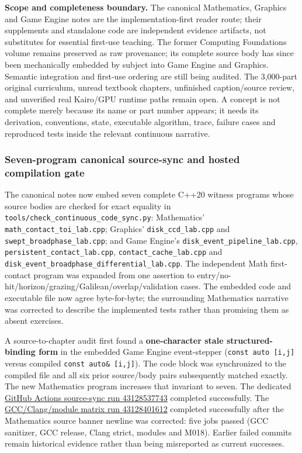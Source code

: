 \textbf{Scope and completeness boundary.} The canonical Mathematics, Graphics and Game Engine notes are the implementation-first reader route; their supplements and standalone code are independent evidence artifacts, not substitutes for essential first-use teaching. The former Computing Foundations volume remains preserved as raw provenance; its complete source body has since been mechanically embedded by subject into Game Engine and Graphics. Semantic integration and first-use ordering are still being audited. The 3,000-part original curriculum, unread textbook chapters, unfinished caption/source review, and unverified real Kairo/GPU runtime paths remain open. A concept is not complete merely because its name or part number appears; it needs its derivation, conventions, state, executable algorithm, trace, failure cases and reproduced tests inside the relevant continuous narrative.

\subsubsection{Seven-program canonical source-sync and hosted compilation gate}\label{appendix-3b67654799a2-seven-program-canonical-source-sync-and-hosted-compilation-gate}

The canonical notes now embed seven complete C++20 witness programs whose source bodies are checked for exact equality in \texttt{tools/check\_continuous\_code\_sync.py}: Mathematics' \texttt{math\_contact\_toi\_lab.cpp}; Graphics' \texttt{disk\_ccd\_lab.cpp} and \texttt{swept\_broadphase\_lab.cpp}; and Game Engine's \texttt{disk\_event\_pipeline\_lab.cpp}, \texttt{persistent\_contact\_lab.cpp}, \texttt{contact\_cache\_lab.cpp} and \texttt{disk\_event\_broadphase\_differential\_lab.cpp}. The independent Math first-contact program was expanded from one assertion to entry/no-hit/horizon/grazing/Galilean/overlap/validation cases. The embedded code and executable file now agree byte-for-byte; the surrounding Mathematics narrative was corrected to describe the implemented tests rather than promising them as absent exercises.

A source-to-chapter audit first found a \textbf{one-character stale structured-binding form} in the embedded Game Engine event-stepper (\texttt{const\ auto\ {[}i,j{]}} versus compiled \texttt{const\ auto\&\ {[}i,j{]}}). The code block was synchronized to the compiled file and all six prior source/body pairs subsequently matched exactly. The new Mathematics program increases that invariant to seven. The dedicated \href{https://github.com/swayam8624/Project_008_AllMight/actions/runs/43128537743}{GitHub Actions source-sync run 43128537743} completed successfully. The \href{https://github.com/swayam8624/Project_008_AllMight/actions/runs/43128401612}{GCC/Clang/module matrix run 43128401612} completed successfully after the Mathematics source banner newline was corrected: five jobs passed (GCC sanitizer, GCC release, Clang strict, modules and M018). Earlier failed commits remain historical evidence rather than being misreported as current successes.

